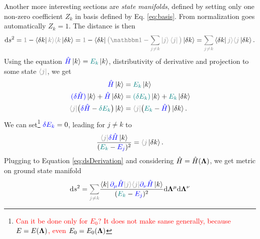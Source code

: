 Another more interesting sections are \emph{state manifolds}, defined by setting only one non-zero coefficient $Z_k$ in basis defined by Eq. \ref{eq:basis}. From normalization goes automatically $Z_k=1$. 
The distance is then
\begin{equation}
    \d s^2 = \textcolor{gray}{1}-\bra{\delta k}\textcolor{gray}{k\rangle \langle k}\ket{\delta k}=\textcolor{gray}{1}-\bra{\delta k}\textcolor{gray}{\big(\Id-\sum_{j\neq k} \ket{j}\bra{j}\big)}\ket{\delta k} = \textcolor{gray}{\sum_{j\neq k}}\bra{\delta k}\textcolor{gray}{j\rangle \langle j}\ket{\delta k}.
    \label{eq:dsDerivation}
\end{equation}
Using the \Schrodinger equation $\textcolor{blue}{\hat{H}}\ket{k}=\textcolor{teal}{E_k} \ket{k}$, distributivity of derivative and projection to some state $\textcolor{gray}{\bra{j}}$, we get
\begin{equation}
    \begin{split}
        \textcolor{blue}{\HH}\ket{k} &= \textcolor{teal}{E_k}\ket{k}\\
        \textcolor{blue}{(\delta \HH)}\ket{k} +\textcolor{blue}{\HH}\ket{\delta k} &=\textcolor{teal}{(\delta E_k)}\ket{k} +\textcolor{teal}{E_k}\ket{\delta k}\\
         \textcolor{gray}{\bra{j}}\big(\textcolor{blue}{\delta \HH}-\textcolor{teal}{\delta E_k}\big)\ket{k}&=\textcolor{gray}{\bra{j}}\big(\textcolor{teal}{E_k}-\textcolor{blue}{\HH}\big)\ket{\delta k}.
    \end{split}
\end{equation}
We can set\footnote{\textcolor{red}{Can it be done only for $E_0$? It does not make sanse generally, because $E=E({\bm\Lambda})$, even $E_0=E_0({\bm\Lambda})$}} $\textcolor{blue}{\delta E_k}=0$, leading for $j\neq k$ to
\begin{equation}
    \frac{\textcolor{gray}{\bra{j}}\textcolor{blue}{\delta \HH}\ket{k}}{(\textcolor{teal}{E_k}-\textcolor{blue}{E_j})^2}=\textcolor{gray}{\langle j}\ket{\delta k}.
    \label{eq:braket_k,deltaj}
\end{equation}
Plugging to Equation \ref{eq:dsDerivation} and considering $\hat{H}=\hat{H}({\bm\Lambda})$, we get metric on ground state manifold
\begin{equation}
    \d s^2 = \textcolor{gray}{\sum_{j\neq k}} \frac{\bra{k}\textcolor{blue}{\partial_\mu \HH \textcolor{gray}{\ket{j}}}\textcolor{gray}{\bra{j}}\textcolor{blue}{\partial_\nu \HH}\ket{k}}{(\textcolor{teal}{E_k}-\textcolor{blue}{E_j})^2}  \d \llambda^\mu\d \llambda^\nu
    \label{eq:distanceonM}
\end{equation}


